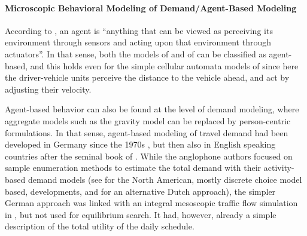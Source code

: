 \paragraph{Microscopic Behavioral Modeling of Demand/Agent-Based Modeling} 
According to \citet[][p.~53]{RusselNorvig2010ArtificialIntelligence}, an \gls{agent} is ``anything that can be viewed as perceiving its environment through sensors and acting upon that environment through actuators''. In that sense, both the models of \citet{Seddon_Simulation_1972} and of \citet{Wiedemann_PhDThesis_1974} can be classified as agent-based, and this holds even for the simple cellular automata models of \citet{NagelSchreckenberg1992CA} since here the driver-vehicle units perceive the distance to the vehicle ahead, and act by adjusting their velocity.  

Agent-based behavior can also be found at the level of demand modeling, where aggregate models such as the gravity model \citep{Wilson1971SpatialInteraction} can be replaced by person-centric formulations. In that sense, agent-based modeling of travel demand had been developed in Germany since the 1970s \citep[see the references in][]{AxhausenHerz_JTE_1989}, but then also in English speaking countries after the seminal book of \citet[][]{JonesEtAl_1983}.  
%
%
While the anglophone authors focused on sample enumeration methods to estimate the total demand with their 
activity-based demand models (see \citet[][]{BradleyBowman_TRBTDF_2006} for the North American, mostly discrete choice model based, developments, and \citet[][]{ArentzeTimmermans_2000} for an alternative Dutch approach), the simpler German approach was linked with an integral mesoscopic traffic flow simulation in \citet[][]{Axhausen_PhDThesis_1988}, but not used for equilibrium search. It had, however, already a simple description of the total utility of the daily schedule.


